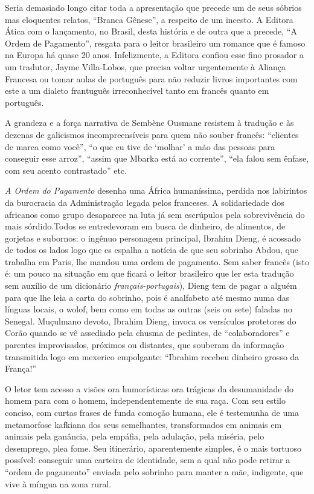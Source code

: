 \documentclass[
  letterpaper,
  DIV=11,
  numbers=noendperiod]{scrreprt}
\begin{document}
Seria demasiado longo citar toda a apresentação que precede um de seus
sóbrios mas eloquentes relatos, ``Branca Gênese'', a respeito de um
incesto. A Editora Ática com o lançamento, no Brasil, desta história e
de outra que a precede, ``A Ordem de Pagamento'', resgata para o leitor
brasileiro um romance que é famoso na Europa há quase 20 anos.
Infelizmente, a Editora confiou esse fino prosador a um tradutor, Jayme
Villa-Lobos, que precisa voltar urgentemente à Aliança Francesa ou tomar
aulas de português para não reduzir livros importantes com este a um
dialeto frantuguês irreconhecível tanto em francês quanto em português.

A grandeza e a força narrativa de Sembène Ousmane resistem à tradução e
às dezenas de galicismos incompreensíveis para quem não souber francês:
``clientes de marca como você'', ``o que eu tive de `molhar' a mão das
pessoas para conseguir esse arroz'', ``assim que Mbarka está ao
corrente'', ``ela falou sem ênfase, com seu acento contrastado'' etc.

\emph{A Ordem do Pagamento} desenha uma África humaníssima, perdida nos
labirintos da burocracia da Administração legada pelos franceses. A
solidariedade dos africanos como grupo desaparece na luta já sem
escrúpulos pela sobrevivência do mais sórdido.Todos se entredevoram em
busca de dinheiro, de alimentos, de gorjetas e subornos: o ingênuo
personagem principal, Ibrahim Dieng, é acossado de todos os lados logo
que es espalha a notícia de que seu sobrinho Abdou, que trabalha em
Paris, lhe mandou uma ordem de pagamento. Sem saber francês (isto é: um
pouco na situação em que ficará o leitor brasileiro que ler esta
tradução sem auxílio de um dicionário \emph{français-portugais}), Dieng
tem de pagar a alguém para que lhe leia a carta do sobrinho, pois é
analfabeto até mesmo numa das línguas locais, o wolof, bem como em todas
as outras (seis ou sete) faladas no Senegal. Muçulmano devoto, Ibrahim
Dieng, invoca os versículos protetores do Corão quando se vê assediado
pela chusma de pedintes, de ``colaboradores'' e parentes improvisados,
próximos ou distantes, que souberam da informação transmitida logo em
mexerico empolgante: ``Ibrahim recebeu dinheiro grosso da França!''

O letor tem acesso a visões ora humorísticas ora trágicas da
desumanidade do homem para com o homem, independentemente de sua raça.
Com seu estilo conciso, com curtas frases de funda comoção humana, ele é
testemunha de uma metamorfose kafkiana dos seus semelhantes,
transformados em animais em animais pela ganância, pela empáfia, pela
adulação, pela miséria, pelo desemprego, plea fome. Seu itinerário,
aparentemente simples, é o mais tortuoso possível: conseguir uma
carteira de identidade, sem a qual não pode retirar a ``ordem de
pagamento'' enviada pelo sobrinho para manter a mãe, indigente, que vive
à míngua na zona rural.
\end{document}
